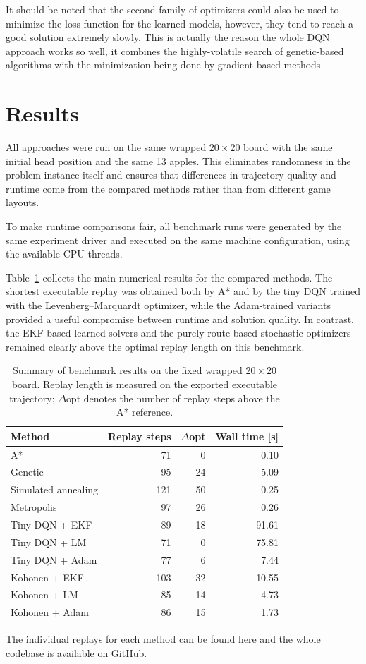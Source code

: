 \documentclass{article}
\begin{document}
It should be noted that the second family of optimizers could also be used to minimize the loss function for the learned models, however, they tend to reach a good solution extremely slowly. This is actually the reason the whole DQN approach works so well, it combines the highly-volatile search of genetic-based algorithms with the minimization being done by gradient-based methods.

\section{Results}

All approaches were run on the same wrapped $20 \times 20$ board with the same initial head position and the same 13 apples. This eliminates randomness in the problem instance itself and ensures that differences in trajectory quality and runtime come from the compared methods rather than from different game layouts.

To make runtime comparisons fair, all benchmark runs were generated by the same experiment driver and executed on the same machine configuration, using the available CPU threads.


Table~\ref{tab:benchmark-summary} collects the main numerical results for the compared methods. The shortest executable replay was obtained both by A* and by the tiny DQN trained with the Levenberg--Marquardt optimizer, while the Adam-trained variants provided a useful compromise between runtime and solution quality. In contrast, the EKF-based learned solvers and the purely route-based stochastic optimizers remained clearly above the optimal replay length on this benchmark.

\begin{table}[h]
    \centering
    \begin{tabular}{lrrr}
        \toprule
        Method & Replay steps & $\Delta$opt & Wall time [s] \\
        \midrule
        A* & 71 & 0 & 0.10 \\
        Genetic & 95 & 24 & 5.09 \\
        Simulated annealing & 121 & 50 & 0.25 \\
        Metropolis & 97 & 26 & 0.26 \\
        Tiny DQN + EKF & 89 & 18 & 91.61 \\
        Tiny DQN + LM & 71 & 0 & 75.81 \\
        Tiny DQN + Adam & 77 & 6 & 7.44 \\
        Kohonen + EKF & 103 & 32 & 10.55 \\
        Kohonen + LM & 85 & 14 & 4.73 \\
        Kohonen + Adam & 86 & 15 & 1.73 \\
        \bottomrule
    \end{tabular}
    \caption{Summary of benchmark results on the fixed wrapped $20 \times 20$ board. Replay length is measured on the exported executable trajectory; $\Delta$opt denotes the number of replay steps above the A* reference.}
    \label{tab:benchmark-summary}
\end{table}

The individual replays for each method can be found \href{https://kovacoj.github.io/mazerunner/frontend/}{here} and the whole codebase is available on \href{https://github.com/kovacoj/mazerunner}{GitHub}.
\end{document}
